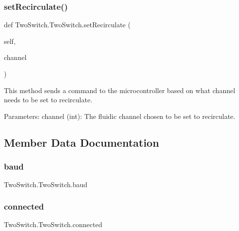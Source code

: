 \subsubsection{\texorpdfstring{setRecirculate()}{setRecirculate()}}
{\footnotesize\ttfamily def Two\+Switch.\+Two\+Switch.\+set\+Recirculate (\begin{DoxyParamCaption}\item[{}]{self,  }\item[{}]{channel }\end{DoxyParamCaption})}

\begin{DoxyVerb}This method sends a command to the microcontroller based on what channel needs to be set to recirculate.

Parameters:
    channel (int): The fluidic channel chosen to be set to recirculate.
\end{DoxyVerb}
 

\subsection{Member Data Documentation}
\mbox{\label{class_two_switch_1_1_two_switch_a9fe7ee9555de6382e4be1419d7580203}} 
\subsubsection{\texorpdfstring{baud}{baud}}
{\footnotesize\ttfamily Two\+Switch.\+Two\+Switch.\+baud}

\mbox{\label{class_two_switch_1_1_two_switch_a643bdc6e214c03d08cba1b722be10e40}} 
\subsubsection{\texorpdfstring{connected}{connected}}
{\footnotesize\ttfamily Two\+Switch.\+Two\+Switch.\+connected}

\mbox{\label{class_two_switch_1_1_two_switch_a125dcd40f5242394787f7f5b1f3cfe71}} 
